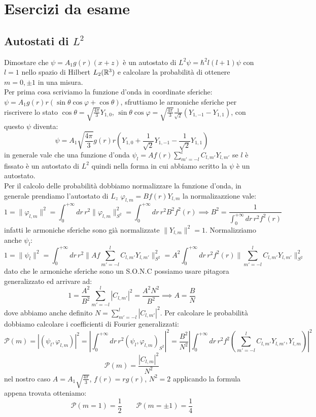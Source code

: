 \chapter{Esercizi da esame}
\section{Autostati di $L^2$}
Dimostare che $\psi = A_1 g(r)(x+z)$ è un autostato di $L^2\psi = \hbar^2 l(l+1)\psi$ con $l=1$ nello spazio di Hilbert $L_2(\mathbb{R}^3)$ e calcolare la probabilità di ottenere $m=0,\pm1$ in una misura.\\
\newline 
Per prima cosa scriviamo la funzione d'onda in coordinate sferiche: $\psi = A_1 g(r)r(\sin\theta\cos\varphi+\cos\theta)$, sfruttiamo le armoniche sferiche per riscrivere lo stato $\cos\theta = \sqrt{\frac{4\pi}{3}}Y_{1,0}$, $\sin\theta\cos\varphi = \sqrt{\frac{4\pi}{3}} \frac{1}{\sqrt{2}}(Y_{1,-1} -Y_{1,1})$, con questo $\psi$ diventa:
\[\psi =A_1 \sqrt{\frac{4\pi}{3}}g(r)r\left(Y_{1,0} +\frac{1}{\sqrt{2}}Y_{1,-1} -\frac{1}{\sqrt{2}}Y_{1,1}\right) \]
in generale vale che una funzione d'onda $\psi_l = A f(r) \sum_{m'=-l}^{l}C_{l,m'}Y_{l,m'}$ se $l$ è fissato è un autostato di $L^2$ quindi nella forma in cui abbiamo scritto la $\psi$ è un autostato.\\
Per il calcolo delle probabilità dobbiamo normalizzare la funzione d'onda, in generale prendiamo l'autostato di $L_z$ $\varphi_{l,m} = Bf(r)Y_{l,m}$ la normalizazzione vale:
\[1 = \|\varphi_{l,m}\|^2 = \int_0^{+\infty}dr\,r^2 \|\varphi_{l,m}\|^2_{S^2} = \int_0^{+\infty}dr\,r^2 B^2 f^2(r) \implies B^2 = \frac{1}{\int_0^{+\infty}dr\,r^2f^2(r)}\]
infatti le armoniche sferiche sono già normalizzate $\|Y_{l,m}\|^2=1$. Normalizziamo anche $\psi_l$:
\[1 = \|\psi_l\|^2 =  \int_0^{+\infty}dr\,r^2 \|Af \sum_{m'=-l}^{l}C_{l,m'}Y_{l,m'}\|^2_{S^2} = A^2 \int_0^{+\infty}dr\,r^2 f^2(r)\|\sum_{m'=-l}^{l}C_{l,m'}Y_{l,m'}\|^2_{S^2} \]
dato che le armoniche sferiche sono un S.O.N.C possiamo usare pitagora generalizzato ed arrivare ad:
\[1 = \frac{A^2}{B^2}\sum_{m'=-l}^{l}|C_{l,m'}|^2 =  \frac{A^2N^2}{B^2} \implies A = \frac{B}{N}\]
dove abbiamo anche definito $N= \sum_{m'=-l}^{l}|C_{l,m'}|^2$. Per calcolare le probabilità dobbiamo calcolare i coefficienti di Fourier generalizzati:
\[\mathcal{P}(m) = |(\psi_l , \varphi_{l,m})|^2 = \left|\int_0^{+\infty}dr\,r^2 (\psi_l,\varphi_{l,m})_{S^2} \right|^2 = \frac{B^2}{N^2}  \left|\int_0^{+\infty}dr\,r^2 f^2\left(\sum_{m'=-l}^{l}C_{l,m'}Y_{l,m'},Y_{l,m}\right) \right|^2\]
\[\mathcal{P}(m)= \frac{|C_{l,m}|^2}{N^2}\]
nel nostro caso $A = A_1 \sqrt{\frac{4\pi}{3}}$, $f(r) = rg(r)$, $N^2 = 2$ applicando la formula appena trovata otteniamo:
\[\mathcal{P}(m=1) = \frac{1}{2}\qquad \mathcal{P}(m=\pm1) = \frac{1}{4}\]
